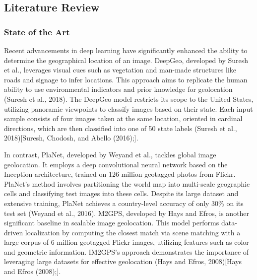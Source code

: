 \subsection{Literature Review}\label{literature-review}

\subsubsection{State of the Art}\label{state-of-the-art}

Recent advancements in deep learning have significantly enhanced the
ability to determine the geographical location of an image. DeepGeo,
developed by Suresh et al., leverages visual cues such as vegetation and
man-made structures like roads and signage to infer locations. This
approach aims to replicate the human ability to use environmental
indicators and prior knowledge for geolocation (Suresh et al., 2018).
The DeepGeo model restricts its scope to the United States, utilizing
panoramic viewpoints to classify images based on their state. Each input
sample consists of four images taken at the same location, oriented in
cardinal directions, which are then classified into one of 50 state
labels (Suresh et al., 2018){[}Suresh, Chodosh, and Abello (2016);{]}.

In contrast, PlaNet, developed by Weyand et al., tackles global image
geolocation. It employs a deep convolutional neural network based on the
Inception architecture, trained on 126 million geotagged photos from
Flickr. PlaNet's method involves partitioning the world map into
multi-scale geographic cells and classifying test images into these
cells. Despite its large dataset and extensive training, PlaNet achieves
a country-level accuracy of only 30\% on its test set (Weyand et al.,
2016). M2GPS, developed by Hays and Efros, is another significant
baseline in scalable image geolocation. This model performs data-driven
localization by computing the closest match via scene matching with a
large corpus of 6 million geotagged Flickr images, utilizing features
such as color and geometric information. IM2GPS's approach demonstrates
the importance of leveraging large datasets for effective geolocation
(Hays and Efros, 2008){[}Hays and Efros
(2008);{]}\hspace{0pt}\hspace{0pt}.

